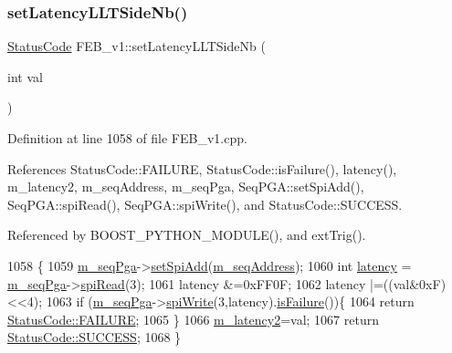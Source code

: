 \subsubsection{\texorpdfstring{set\+Latency\+L\+L\+T\+Side\+Nb()}{setLatencyLLTSideNb()}}
{\footnotesize\ttfamily \hyperlink{classStatusCode}{Status\+Code} F\+E\+B\+\_\+v1\+::set\+Latency\+L\+L\+T\+Side\+Nb (\begin{DoxyParamCaption}\item[{int}]{val }\end{DoxyParamCaption})}



Definition at line 1058 of file F\+E\+B\+\_\+v1.\+cpp.



References Status\+Code\+::\+F\+A\+I\+L\+U\+RE, Status\+Code\+::is\+Failure(), latency(), m\+\_\+latency2, m\+\_\+seq\+Address, m\+\_\+seq\+Pga, Seq\+P\+G\+A\+::set\+Spi\+Add(), Seq\+P\+G\+A\+::spi\+Read(), Seq\+P\+G\+A\+::spi\+Write(), and Status\+Code\+::\+S\+U\+C\+C\+E\+SS.



Referenced by B\+O\+O\+S\+T\+\_\+\+P\+Y\+T\+H\+O\+N\+\_\+\+M\+O\+D\+U\+L\+E(), and ext\+Trig().


\begin{DoxyCode}
1058                                              \{
1059   \hyperlink{classFEB__v1_a6c7804ac86796f233a8393043adf2e77}{m\_seqPga}->\hyperlink{classSeqPGA_ac998ce3a6d9b5f2e88cc8393f8c1df53}{setSpiAdd}(\hyperlink{classFEB__v1_a1c1eb093fd1733b9510fcf8bc5c7ad08}{m\_seqAddress});
1060   \textcolor{keywordtype}{int} \hyperlink{classFEB__v1_a68050d232efd8d6568910b09a2c18f62}{latency} = \hyperlink{classFEB__v1_a6c7804ac86796f233a8393043adf2e77}{m\_seqPga}->\hyperlink{classSeqPGA_ab3d0e5e5d4014bc7a92588a76b8713d4}{spiRead}(3);
1061   latency &=0xFF0F;
1062   latency |=((val&0xF)<<4);
1063    \textcolor{keywordflow}{if} (\hyperlink{classFEB__v1_a6c7804ac86796f233a8393043adf2e77}{m\_seqPga}->\hyperlink{classSeqPGA_ad4421841ce4ce8b88ad13f63216f0743}{spiWrite}(3,latency).\hyperlink{classStatusCode_a5dd22dc6eb2c52fc4cabc58f6dea2eb7}{isFailure}())\{
1064     \textcolor{keywordflow}{return} \hyperlink{classStatusCode_a6f565cbeadc76d14c72f047e5e85eb4ba3da73d4c469762eb9d3c960368252b26}{StatusCode::FAILURE};
1065   \}
1066    \hyperlink{classFEB__v1_a2c4b18efd76de3bf7089bba57fb6744f}{m\_latency2}=val;
1067   \textcolor{keywordflow}{return} \hyperlink{classStatusCode_a6f565cbeadc76d14c72f047e5e85eb4badd0da38d3ba0d922efd1f4619bc37ad8}{StatusCode::SUCCESS};   
1068 \}
\end{DoxyCode}
\mbox{\label{classFEB__v1_a8a3aafdda0f1028e02c4a5850f987f32}} 
